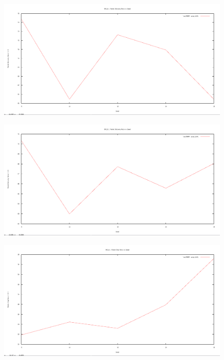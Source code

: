 \documentclass[12pt]{article}
\begin{document}
\begin{figure}[H]
	\centering
	\includegraphics[scale=	0.26]{image/bpics/bm_packetdeliveryratio_vs_speed.png}
\end{figure}

\begin{figure}[H]
	\centering
	\includegraphics[scale=	0.26]{image/apics/am_packetdeliveryratio_vs_speed.png}
\end{figure}


\begin{figure}[H]
	\centering
	\includegraphics[scale=	0.26]{image/bpics/bm_packetdropratio_vs_speed.png}
\end{figure}
\end{document}

